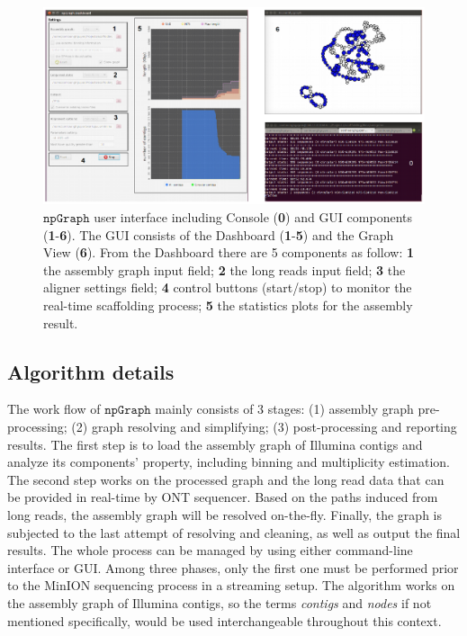 \documentclass[10pt,letterpaper]{article}
\newcommand{\npgraph}{$\mathtt{npGraph}$}
\begin{document}
\begin{figure}[!hpt]
\centering
\includegraphics[width=\textwidth]{images/Fig2.eps}
\caption{\npgraph{} user interface including Console (\textbf{0}) and GUI components (\textbf{1}-\textbf{6}). The GUI consists of the Dashboard (\textbf{1}-\textbf{5}) and the Graph View (\textbf{6}). From the Dashboard there are 5 components as follow: \textbf{1} the assembly graph input field; \textbf{2} the long reads input field; \textbf{3} the aligner settings field; \textbf{4} control buttons (start/stop) to monitor the real-time scaffolding process; \textbf{5} the statistics plots for the assembly result.}
\label{figure:npgraph_gui}
\end{figure}

\subsection*{Algorithm  details}
The work flow of \npgraph{} mainly consists of 3 stages: (1) assembly graph pre-processing; (2) graph resolving and simplifying; (3) post-processing and reporting results. 
The first step is to load the assembly graph of Illumina contigs and analyze its components' property, including binning and multiplicity estimation.
The second step works on the processed graph and the long read data that can be provided in real-time by ONT sequencer. Based on the paths induced from long reads, the assembly graph will be resolved on-the-fly.
Finally, the graph is subjected to the last attempt of resolving and cleaning, as well as output the final results. The whole process can be managed by using either command-line interface or GUI.
Among three phases, only the first one must be performed prior to the MinION sequencing process in a streaming setup.
The algorithm works on the assembly graph of Illumina contigs, so the terms \emph{contigs} and \emph{nodes} if not mentioned specifically, would be used interchangeable throughout this context.
\end{document}

